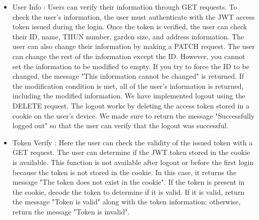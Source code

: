 \documentclass[conference, a4paper]{IEEEtran}
\begin{document}
\begin{enumerate}
\begin{itemize}
\begin{itemize}
\begin{itemize}
                \item User Info : Users can verify their information through GET requests. To check the user's information, the user must authenticate with the JWT access token issued during the login. Once the token is verified, the user can check their ID, name, TIIUN number, garden size, and address information. The user can also change their information by making a PATCH request. The user can change the rest of the information except the ID. However, you cannot set the information to be modified to empty. If you try to force the ID to be changed, the message "This information cannot be changed" is returned. If the modification condition is met, all of the user's information is returned, including the modified information. We have implemented logout using the DELETE request. The logout works by deleting the access token stored in a cookie on the user's device. We made sure to return the message "Successfully logged out" so that the user can verify that the logout was successful. \\
                \item Token Verify : Here the user can check the validity of the issued token with a GET request. The user can determine if the JWT token stored in the cookie is available. This function is not available after logout or before the first login because the token is not stored in the cookie. In this case, it returns the message "The token does not exist in the cookie". If the token is present in the cookie, decode the token to determine if it is valid. If it is valid, return the message "Token is valid" along with the token information; otherwise, return the message "Token is invalid".
            \end{itemize}
        \end{itemize}


\end{itemize}
\end{enumerate}
\end{document}
